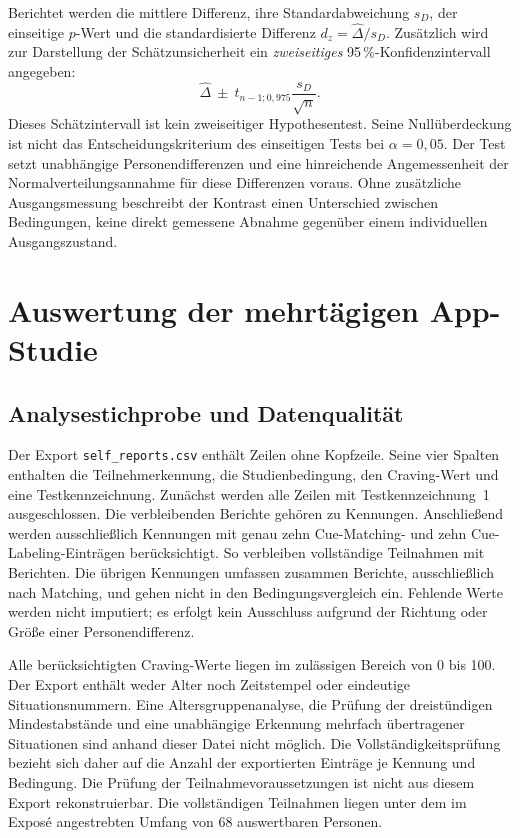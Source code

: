 Berichtet werden die mittlere Differenz, ihre Standardabweichung $s_D$, der einseitige $p$-Wert und die standardisierte Differenz $d_z=\widehat{\Delta}/s_D$. Zusätzlich wird zur Darstellung der Schätzunsicherheit ein \emph{zweiseitiges} 95\,\%-Konfidenzintervall angegeben:
\begin{equation}
 \widehat{\Delta}\ \pm\ t_{n-1;0{,}975}\frac{s_D}{\sqrt{n}}.
\end{equation}
Dieses Schätzintervall ist kein zweiseitiger Hypothesentest. Seine Nullüberdeckung ist nicht das Entscheidungskriterium des einseitigen Tests bei $\alpha=0{,}05$. Der Test setzt unabhängige Personendifferenzen und eine hinreichende Angemessenheit der Normalverteilungsannahme für diese Differenzen voraus. Ohne zusätzliche Ausgangsmessung beschreibt der Kontrast einen Unterschied zwischen Bedingungen, keine direkt gemessene Abnahme gegenüber einem individuellen Ausgangszustand.

\section{Auswertung der mehrtägigen App-Studie}
\label{sec:app-auswertung}
\subsection{Analysestichprobe und Datenqualität}
Der Export \texttt{self\_reports.csv} enthält \AppRawRows{} Zeilen ohne Kopfzeile. Seine vier Spalten enthalten die Teilnehmerkennung, die Studienbedingung, den Craving-Wert und eine Testkennzeichnung. Zunächst werden alle \AppTestRows{} Zeilen mit Testkennzeichnung~1 ausgeschlossen. Die verbleibenden \AppNonTestRows{} Berichte gehören zu \AppNonTestIds{} Kennungen. Anschließend werden ausschließlich Kennungen mit genau zehn Cue-Matching- und zehn Cue-Labeling-Einträgen berücksichtigt. So verbleiben \AppN{} vollständige Teilnahmen mit \AppCompleteRows{} Berichten. Die übrigen \AppIncompleteIds{} Kennungen umfassen zusammen \AppExcludedRows{} Berichte, ausschließlich nach Matching, und gehen nicht in den Bedingungsvergleich ein. Fehlende Werte werden nicht imputiert; es erfolgt kein Ausschluss aufgrund der Richtung oder Größe einer Personendifferenz.

Alle berücksichtigten Craving-Werte liegen im zulässigen Bereich von 0 bis 100. Der Export enthält weder Alter noch Zeitstempel oder eindeutige Situationsnummern. Eine Altersgruppenanalyse, die Prüfung der dreistündigen Mindestabstände und eine unabhängige Erkennung mehrfach übertragener Situationen sind anhand dieser Datei nicht möglich. Die Vollständigkeitsprüfung bezieht sich daher auf die Anzahl der exportierten Einträge je Kennung und Bedingung. Die Prüfung der Teilnahmevoraussetzungen ist nicht aus diesem Export rekonstruierbar. Die \AppN{} vollständigen Teilnahmen liegen unter dem im Exposé angestrebten Umfang von 68 auswertbaren Personen.

